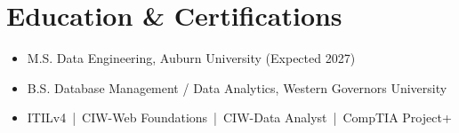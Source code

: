 \section*{Education \& Certifications}
\begin{itemize}
  \item M.S. Data Engineering, Auburn University (Expected 2027)
  \item B.S. Database Management / Data Analytics, Western Governors University
  \item ITILv4 \,|\, CIW-Web Foundations \,|\, CIW-Data Analyst \,|\, CompTIA Project+
\end{itemize}
